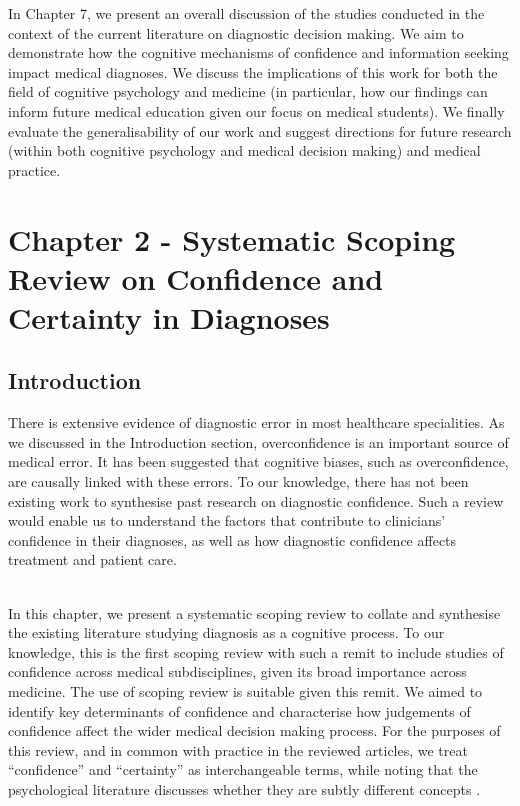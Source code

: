 \documentclass[a4paper, nobind]{templates/ociamthesis}
\begin{document}
\hfill\break
In Chapter 7, we present an overall discussion of the studies conducted in the context of the current literature on diagnostic decision making. We aim to demonstrate how the cognitive mechanisms of confidence and information seeking impact medical diagnoses. We discuss the implications of this work for both the field of cognitive psychology and medicine (in particular, how our findings can inform future medical education given our focus on medical students). We finally evaluate the generalisability of our work and suggest directions for future research (within both cognitive psychology and medical decision making) and medical practice.

\chapter{Chapter 2 - Systematic Scoping Review on Confidence and Certainty in Diagnoses}\label{chapter-2}

\adjustmtc
{}

\section{Introduction}\label{introduction}

There is extensive evidence of diagnostic error in most healthcare specialities. As we discussed in the Introduction section, overconfidence is an important source of medical error. It has been suggested that cognitive biases, such as overconfidence, are causally linked with these errors. To our knowledge, there has not been existing work to synthesise past research on diagnostic confidence. Such a review would enable us to understand the factors that contribute to clinicians' confidence in their diagnoses, as well as how diagnostic confidence affects treatment and patient care.\\
\strut \\
In this chapter, we present a systematic scoping review to collate and synthesise the existing literature studying diagnosis as a cognitive process. To our knowledge, this is the first scoping review with such a remit to include studies of confidence across medical subdisciplines, given its broad importance across medicine. The use of scoping review is suitable given this remit. We aimed to identify key determinants of confidence and characterise how judgements of confidence affect the wider medical decision making process. For the purposes of this review, and in common with practice in the reviewed articles, we treat ``confidence'' and ``certainty'' as interchangeable terms, while noting that the psychological literature discusses whether they are subtly different concepts \autocite{pouget_confidence_2016}.
\end{document}
